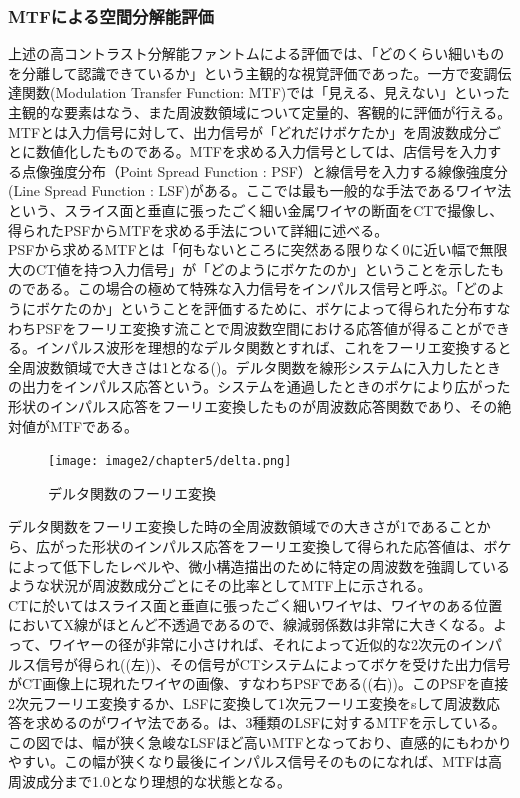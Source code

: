 \subsubsection*{MTFによる空間分解能評価}
上述の高コントラスト分解能ファントムによる評価では、「どのくらい細いものを分離して認識できているか」という主観的な視覚評価であった。一方で変調伝達関数(Modulation Transfer Function: MTF)では「見える、見えない」といった主観的な要素はなう、また周波数領域について定量的、客観的に評価が行える。MTFとは入力信号に対して、出力信号が「どれだけボケたか」を周波数成分ごとに数値化したものである。MTFを求める入力信号としては、店信号を入力する点像強度分布（Point Spread Function : PSF）と線信号を入力する線像強度分(Line Spread Function : LSF)がある。ここでは最も一般的な手法であるワイヤ法という、スライス面と垂直に張ったごく細い金属ワイヤの断面をCTで撮像し、得られたPSFからMTFを求める手法について詳細に述べる。\\
PSFから求めるMTFとは「何もないところに突然ある限りなく0に近い幅で無限大のCT値を持つ入力信号」が「どのようにボケたのか」ということを示したものである。この場合の極めて特殊な入力信号をインパルス信号と呼ぶ。「どのようにボケたのか」ということを評価するために、ボケによって得られた分布すなわちPSFをフーリエ変換す流ことで周波数空間における応答値が得ることができる。インパルス波形を理想的なデルタ関数とすれば、これをフーリエ変換すると全周波数領域で大きさは1となる()。デルタ関数を線形システムに入力したときの出力をインパルス応答という。システムを通過したときのボケにより広がった形状のインパルス応答をフーリエ変換したものが周波数応答関数であり、その絶対値がMTFである。\\

\begin{figure}[H]
 \begin{center}
 \texttt{[image: image2/chapter5/delta.png]} 
 \end{center}
 \caption{デルタ関数のフーリエ変換}
 \label{fig:delta}
\end{figure}

デルタ関数をフーリエ変換した時の全周波数領域での大きさが1であることから、広がった形状のインパルス応答をフーリエ変換して得られた応答値は、ボケによって低下したレベルや、微小構造描出のために特定の周波数を強調しているような状況が周波数成分ごとにその比率としてMTF上に示される。\\
CTに於いてはスライス面と垂直に張ったごく細いワイヤは、ワイヤのある位置においてX線がほとんど不透過であるので、線減弱係数は非常に大きくなる。よって、ワイヤーの径が非常に小さければ、それによって近似的な2次元のインパルス信号が得られ((左))、その信号がCTシステムによってボケを受けた出力信号がCT画像上に現れたワイヤの画像、すなわちPSFである((右))。このPSFを直接2次元フーリエ変換するか、LSFに変換して1次元フーリエ変換をsして周波数応答を求めるのがワイヤ法である。は、3種類のLSFに対するMTFを示している。この図では、幅が狭く急峻なLSFほど高いMTFとなっており、直感的にもわかりやすい。この幅が狭くなり最後にインパルス信号そのものになれば、MTFは高周波成分まで1.0となり理想的な状態となる。

